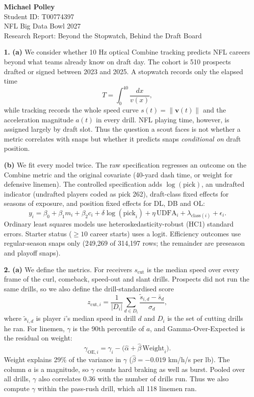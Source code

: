 \documentclass[11pt]{article}
\begin{document}
\begin{center}
    \vspace*{5cm}
    {\LARGE \textbf{Michael Polley}} \\[2em]
    \normalsize Student ID: T00774397 \\[2em]
    NFL Big Data Bowl 2027 \\[2em]
    Research Report: Beyond the Stopwatch, Behind the Draft Board
    \vfill
\end{center}
\thispagestyle{empty}
\newpage

\noindent\textbf{1.}
\noindent\textbf{(a)}
We consider whether 10 Hz optical Combine tracking predicts NFL careers beyond what teams already know on draft day. The cohort is 510 prospects drafted or signed between 2023 and 2025. A stopwatch records only the elapsed time
\[ T = \int_{0}^{40} \frac{dx}{v(x)}, \]
while tracking records the whole speed curve $s(t) = \|\mathbf{v}(t)\|$ and the acceleration magnitude $a(t)$ in every drill. NFL playing time, however, is assigned largely by draft slot. Thus the question a scout faces is not whether a metric correlates with snaps but whether it predicts snaps \emph{conditional on} draft position.

\noindent\textbf{(b)}
We fit every model twice. The raw specification regresses an outcome on the Combine metric and the original covariate (40-yard dash time, or weight for defensive linemen). The controlled specification adds $\log(\text{pick})$, an undrafted indicator (undrafted players coded as pick 262), draft-class fixed effects for seasons of exposure, and position fixed effects for DL, DB and OL:
\[ y_i = \beta_0 + \beta_1 m_i + \beta_2 c_i + \delta \log(\text{pick}_i) + \eta\,\text{UDFA}_i + \lambda_{\text{class}(i)} + \epsilon_i . \]
Ordinary least squares models use heteroskedasticity-robust (HC1) standard errors. Starter status ($\ge 10$ career starts) uses a logit. Efficiency outcomes use regular-season snaps only (249,269 of 314,197 rows; the remainder are preseason and playoff snaps).

\noindent\textbf{2.}
\noindent\textbf{(a)}
We define the metrics. For receivers $s_{\text{cut}}$ is the median speed over every frame of the curl, comeback, speed-out and slant drills. Prospects did not run the same drills, so we also define the drill-standardised score
\[ z_{\text{cut},i} = \frac{1}{|D_i|} \sum_{d \in D_i} \frac{\tilde s_{i,d} - \bar s_d}{\sigma_d}, \]
where $\tilde s_{i,d}$ is player $i$'s median speed in drill $d$ and $D_i$ is the set of cutting drills he ran. For linemen, $\gamma$ is the 90th percentile of $a$, and Gamma-Over-Expected is the residual on weight:
\[ \gamma_{\text{OE},i} = \gamma_i - \big(\hat\alpha + \hat\beta\,\text{Weight}_i\big). \]
Weight explains 29\% of the variance in $\gamma$ ($\hat\beta = -0.019$ km/h/s per lb). The column $a$ is a magnitude, so $\gamma$ counts hard braking as well as burst. Pooled over all drills, $\gamma$ also correlates $0.36$ with the number of drills run. Thus we also compute $\gamma$ within the pass-rush drill, which all 118 linemen ran.
\end{document}
